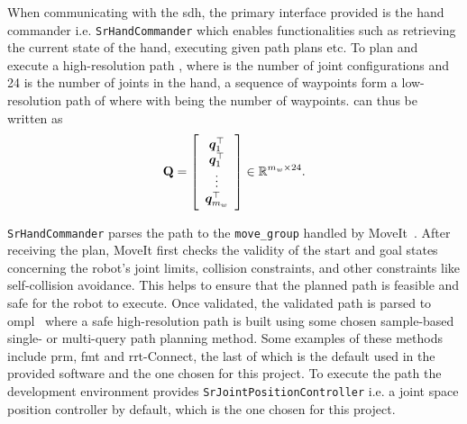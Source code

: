 When communicating with the \gls{sdh}, the primary interface provided is the hand commander i.e. \texttt{SrHandCommander} which enables functionalities such as retrieving the current state of the hand, executing given path plans etc. To plan and execute a high-resolution path , where  is the number of joint configurations and \num{24} is the number of joints in the hand, a sequence of waypoints  form a low-resolution path of  where  with  being the number of waypoints.  can thus be written as
\begin{equation}\label{eq:waypoint-path-matrix}
	\bm{\mathrm{Q}} = 
		\left[\begin{array}{ccc}
			\bm{q}_1^\top \\
			\bm{q}_1^\top \\
			\vdots \\
			\bm{q}_{m_w}^\top
		\end{array}\right] \in\mathbb{R}^{m_w \times 24}.
\end{equation}

\texttt{SrHandCommander} parses the path to the \texttt{move\_group} handled by MoveIt~\cite{reducing-the-barrier-to-entry-of-complex-robotic-software:-a-moveit!-case-study}. After receiving the plan, MoveIt first checks the validity of the start and goal states concerning the robot's joint limits, collision constraints, and other constraints like self-collision avoidance. This helps to ensure that the planned path is feasible and safe for the robot to execute. Once validated, the validated path  is parsed to \gls{ompl}~\cite{the-open-motion-planning-library} where a safe high-resolution path is built using some chosen sample-based single- or multi-query path planning method. Some examples of these methods include \gls{prm}, \gls{fmt} and \gls{rrt}-Connect, the last of which is the default used in the provided software and the one chosen for this project. To execute the path the development environment provides \texttt{SrJointPositionController} i.e. a joint space position controller by default, which is the one chosen for this project. \medskip

